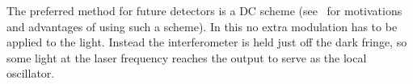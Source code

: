 The preferred method for future detectors is a DC scheme
(see~\cite{Fritschel:2003, Ward:2008, Hild:2009} for motivations and
advantages of using such a scheme). In this no extra modulation has to
be applied to the light. Instead the interferometer is held just off
the dark fringe, so some light at the laser frequency reaches the output
to serve as the local oscillator.
  
